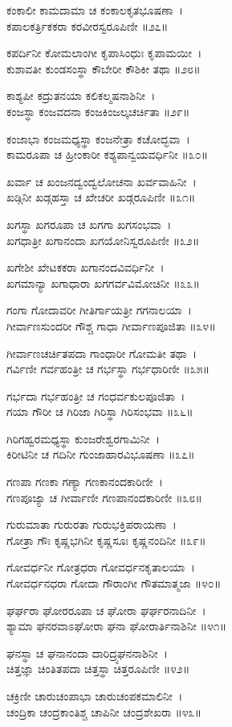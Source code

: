 ಕಂಕಾಲೀ ಕಾಮದಾಮಾ ಚ ಕಂಕಾಲಕೃತಭೂಷಣಾ~।\\
ಕಪಾಲಕರ್ತ್ರಿಕಕರಾ ಕರವೀರಸ್ವರೂಪಿಣೀ ॥೨೭॥

ಕಪರ್ದಿನೀ ಕೋಮಲಾಂಗೀ ಕೃಪಾಸಿಂಧುಃ ಕೃಪಾಮಯೀ~।\\
ಕುಶಾವತೀ ಕುಂಡಸಂಸ್ಥಾ ಕೌಬೇರೀ ಕೌಶಿಕೀ ತಥಾ ॥೨೮॥

ಕಾಶ್ಯಪೀ ಕದ್ರುತನಯಾ ಕಲಿಕಲ್ಮಷನಾಶಿನೀ~।\\
ಕಂಜಸ್ಥಾ ಕಂಜವದನಾ ಕಂಜಕಿಂಜಲ್ಕಚರ್ಚಿತಾ ॥೨೯॥

ಕಂಜಾಭಾ ಕಂಜಮಧ್ಯಸ್ಥಾ ಕಂಜನೇತ್ರಾ ಕಚೋದ್ಭವಾ~।\\
ಕಾಮರೂಪಾ ಚ ಹ್ರೀಂಕಾರೀ ಕಶ್ಯಪಾನ್ವಯವರ್ಧಿನೀ ॥೩೦॥

ಖರ್ವಾ ಚ ಖಂಜನದ್ವಂದ್ವಲೋಚನಾ ಖರ್ವವಾಹಿನೀ~।\\
ಖಡ್ಗಿನೀ ಖಡ್ಗಹಸ್ತಾ ಚ ಖೇಚರೀ ಖಡ್ಗರೂಪಿಣೀ ॥೩೧॥

ಖಗಸ್ಥಾ ಖಗರೂಪಾ ಚ ಖಗಗಾ ಖಗಸಂಭವಾ~।\\
ಖಗಧಾತ್ರೀ ಖಗಾನಂದಾ ಖಗಯೋನಿಸ್ವರೂಪಿಣೀ ॥೩೨॥

ಖಗೇಶೀ ಖೇಟಕಕರಾ ಖಗಾನಂದವಿವರ್ಧಿನೀ~।\\
ಖಗಮಾನ್ಯಾ ಖಗಾಧಾರಾ ಖಗಗರ್ವವಿಮೋಚಿನೀ ॥೩೩॥

ಗಂಗಾ ಗೋದಾವರೀ ಗೀತಿರ್ಗಾಯತ್ರೀ ಗಗನಾಲಯಾ~।\\
ಗೀರ್ವಾಣಸುಂದರೀ ಗೌಶ್ಚ ಗಾಧಾ ಗೀರ್ವಾಣಪೂಜಿತಾ ॥೩೪॥

ಗೀರ್ವಾಣಚರ್ಚಿತಪದಾ ಗಾಂಧಾರೀ ಗೋಮತೀ ತಥಾ~।\\
ಗರ್ವಿಣೀ ಗರ್ವಹಂತ್ರೀ ಚ ಗರ್ಭಸ್ಥಾ ಗರ್ಭಧಾರಿಣೀ ॥೩೫॥

ಗರ್ಭದಾ ಗರ್ಭಹಂತ್ರೀ ಚ ಗಂಧರ್ವಕುಲಪೂಜಿತಾ~।\\
ಗಯಾ ಗೌರೀ ಚ ಗಿರಿಜಾ ಗಿರಿಸ್ಥಾ ಗಿರಿಸಂಭವಾ ॥೩೬॥

ಗಿರಿಗಹ್ವರಮಧ್ಯಸ್ಥಾ ಕುಂಜರೇಶ್ವರಗಾಮಿನೀ~।\\
ಕಿರೀಟಿನೀ ಚ ಗದಿನೀ ಗುಂಜಾಹಾರವಿಭೂಷಣಾ ॥೩೭॥

ಗಣಪಾ ಗಣಕಾ ಗಣ್ಯಾ ಗಣಕಾನಂದಕಾರಿಣೀ~।\\
ಗಣಪೂಜ್ಯಾ ಚ ಗೀರ್ವಾಣೀ ಗಣಪಾನಂದಕಾರಿಣೀ ॥೩೮॥

ಗುರುಮಾತಾ ಗುರುರತಾ ಗುರುಭಕ್ತಿಪರಾಯಣಾ~।\\
ಗೋತ್ರಾ ಗೌಃ ಕೃಷ್ಣಭಗಿನೀ ಕೃಷ್ಣಸೂಃ ಕೃಷ್ಣನಂದಿನೀ ॥೩೯॥

ಗೋವರ್ಧನೀ ಗೋತ್ರಧರಾ ಗೋವರ್ಧನಕೃತಾಲಯಾ~।\\
ಗೋವರ್ಧನಧರಾ ಗೋದಾ ಗೌರಾಂಗೀ ಗೌತಮಾತ್ಮಜಾ ॥೪೦॥

ಘರ್ಘರಾ ಘೋರರೂಪಾ ಚ ಘೋರಾ ಘರ್ಘರನಾದಿನೀ~।\\
ಶ್ಯಾಮಾ ಘನರವಾಽಘೋರಾ ಘನಾ ಘೋರಾರ್ತಿನಾಶಿನೀ ॥೪೧॥

ಘನಸ್ಥಾ ಚ ಘನಾನಂದಾ ದಾರಿದ್ರ್ಯಘನನಾಶಿನೀ~।\\
ಚಿತ್ತಜ್ಞಾ ಚಿಂತಿತಪದಾ ಚಿತ್ತಸ್ಥಾ ಚಿತ್ತರೂಪಿಣೀ ॥೪೨॥

ಚಕ್ರಿಣೀ ಚಾರುಚಂಪಾಭಾ ಚಾರುಚಂಪಕಮಾಲಿನೀ~।\\
ಚಂದ್ರಿಕಾ ಚಂದ್ರಕಾಂತಿಶ್ಚ ಚಾಪಿನೀ ಚಂದ್ರಶೇಖರಾ ॥೪೩॥

